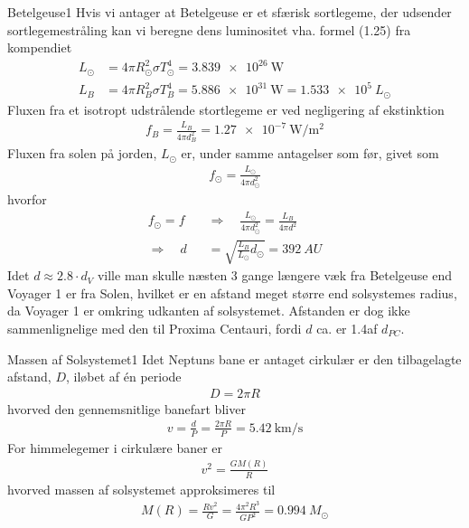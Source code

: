\begin{opgave}{Betelgeuse}{1}
	\opg Hvis vi antager at Betelgeuse er et sfærisk sortlegeme, der udsender sortlegemestråling kan vi beregne dens luminositet vha. formel (1.25) fra kompendiet
	\begin{align*}
	L_\odot &= 4\pi R_\odot^2\sigma T_\odot^4 =\SI{3.839e26}{\watt} \\
	L_B &= 4\pi R_B^2\sigma T_B^4 =\SI{5,886e31}{\watt} = \SI{1,533e5}{L_\odot}
	\end{align*}
	\opg Fluxen fra et isotropt udstrålende stortlegeme er ved negligering af ekstinktion
	\begin{align*}
	f_B = \frac{L_B}{4\pi d_B^2} = \SI{1,27e-7}{\watt\per\metre\squared}
	\end{align*}
	\opg Fluxen fra solen på jorden, $L_\odot$ er, under samme antagelser som før, givet som
	\begin{align*}
	f_\odot = \frac{L_\odot}{4\pi d_\odot^2}
	\end{align*}
	hvorfor
	\begin{align*}
	f_\odot = f \quad&\Rightarrow\quad \frac{L_\odot}{4\pi d_\odot^2} = \frac{L_B}{4\pi d^2} \\
	\Rightarrow\quad d &= \sqrt{\frac{L_B}{L_\odot}d_\odot} = \SI{392}{AU}
	\end{align*}
	\opg Idet $d\approx2.8\cdot d_V$ ville man skulle næsten 3 gange længere væk fra Betelgeuse end Voyager 1 er fra Solen, hvilket er en afstand meget større end solsystemes radius, da Voyager 1 er omkring udkanten af solsystemet. Afstanden er dog ikke sammenlignelige med den til Proxima Centauri, fordi $d$ ca. er 1.4\permil af $d_{PC}$.
\end{opgave}
\begin{opgave}{Massen af Solsystemet}{1}
	\opg Idet Neptuns bane er antaget cirkulær er den tilbagelagte afstand, $D$, iløbet af én periode
	\begin{align*}
	D = 2\pi R
	\end{align*}
	hvorved den gennemsnitlige banefart bliver
	\begin{align*}
	v = \frac{d}{P} = \frac{2\pi R}{P} = \SI{5,42}{\kilo\metre\per\second}
	\end{align*}
	\opg For himmelegemer i cirkulære baner er
	\begin{align*}
	v^2 = \frac{GM(R)}{R}
	\end{align*}
	hvorved massen af solsystemet approksimeres til
	\begin{align*}
	M(R) = \frac{Rv^2}{G} = \frac{4\pi^2R^3}{GP^2} = \SI{0,994}{M_\odot}
	\end{align*}
\end{opgave}